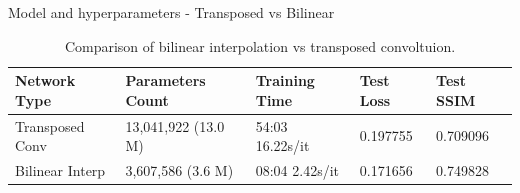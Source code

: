 \documentclass[8pt]{beamer}
\begin{document}
\begin{frame}{Model and hyperparameters - Transposed vs Bilinear}
    \begin{table}[h]
        \centering
        \begin{tabular}{|l|l|l|l|l|}
        \hline
        \textbf{Network Type} & \textbf{Parameters Count} & \textbf{Training Time} & \textbf{Test Loss} & \textbf{Test SSIM} \\
        \hline
        Transposed Conv & 13,041,922 (13.0 M) & 54:03 16.22s/it & 0.197755 & 0.709096 \\
        Bilinear Interp & 3,607,586 (3.6 M) & 08:04 2.42s/it & 0.171656 & 0.749828 \\
        \hline
        \end{tabular}
        \caption{Comparison of bilinear interpolation vs transposed convoltuion.}
        \label{tab:network_comparison}
    \end{table}
\end{frame}
\end{document}
